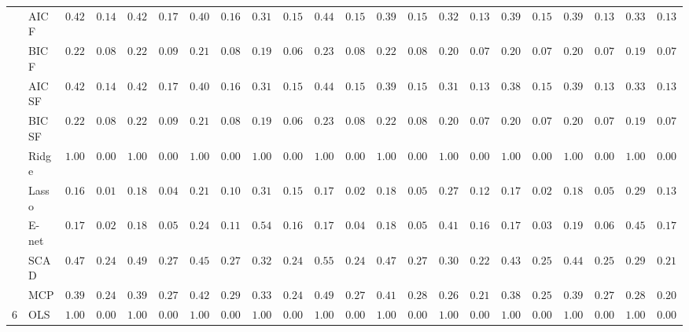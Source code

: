 \begin{tabular}{p{0.2cm}p{1cm}|p{0.6cm}p{0.6cm}|p{0.6cm}p{0.6cm}p{0.6cm}p{0.6cm}p{0.6cm}p{0.6cm}|p{0.6cm}p{0.6cm}p{0.6cm}p{0.6cm}p{0.6cm}p{0.6cm}|p{0.6cm}p{0.6cm}p{0.6cm}p{0.6cm}p{0.6cm}p{0.6cm}}
 & AIC F  & $0.4233$ & $0.1449$ & $0.4217$ & $0.1732$ & $0.4017$ & $0.1626$ & $0.3167$ & $0.1508$ & $0.4483$ & $0.1548$ & $0.3900$ & $0.1557$ & $0.3217$ & $0.1386$ & $0.3900$ & $0.1575$ & $0.3950$ & $0.1374$ & $0.3317$ & $0.1350$ \\
 & BIC F  & $0.2200$ & $0.0816$ & $0.2233$ & $0.0954$ & $0.2100$ & $0.0842$ & $0.1983$ & $0.0699$ & $0.2367$ & $0.0860$ & $0.2217$ & $0.0888$ & $0.2050$ & $0.0744$ & $0.2083$ & $0.0763$ & $0.2017$ & $0.0722$ & $0.1983$ & $0.0738$ \\
 & AIC SF  & $0.4233$ & $0.1449$ & $0.4217$ & $0.1732$ & $0.4017$ & $0.1626$ & $0.3167$ & $0.1508$ & $0.4483$ & $0.1548$ & $0.3900$ & $0.1557$ & $0.3167$ & $0.1350$ & $0.3883$ & $0.1536$ & $0.3950$ & $0.1374$ & $0.3317$ & $0.1350$ \\
 & BIC SF  & $0.2200$ & $0.0816$ & $0.2233$ & $0.0954$ & $0.2100$ & $0.0842$ & $0.1983$ & $0.0699$ & $0.2367$ & $0.0860$ & $0.2217$ & $0.0888$ & $0.2050$ & $0.0744$ & $0.2083$ & $0.0763$ & $0.2017$ & $0.0722$ & $0.1983$ & $0.0738$ \\
 & Ridge  & $1.0000$ & $0.0000$ & $1.0000$ & $0.0000$ & $1.0000$ & $0.0000$ & $1.0000$ & $0.0000$ & $1.0000$ & $0.0000$ & $1.0000$ & $0.0000$ & $1.0000$ & $0.0000$ & $1.0000$ & $0.0000$ & $1.0000$ & $0.0000$ & $1.0000$ & $0.0000$ \\
 & Lasso  & $0.1683$ & $0.0167$ & $0.1817$ & $0.0479$ & $0.2133$ & $0.1035$ & $0.3167$ & $0.1544$ & $0.1717$ & $0.0286$ & $0.1850$ & $0.0575$ & $0.2783$ & $0.1232$ & $0.1700$ & $0.0235$ & $0.1833$ & $0.0556$ & $0.2917$ & $0.1348$ \\
 & E-net  & $0.1700$ & $0.0235$ & $0.1833$ & $0.0503$ & $0.2400$ & $0.1192$ & $0.5433$ & $0.1635$ & $0.1733$ & $0.0405$ & $0.1867$ & $0.0594$ & $0.4133$ & $0.1632$ & $0.1733$ & $0.0328$ & $0.1917$ & $0.0686$ & $0.4517$ & $0.1729$ \\
 & SCAD  & $0.4700$ & $0.2455$ & $0.4933$ & $0.2710$ & $0.4517$ & $0.2725$ & $0.3267$ & $0.2461$ & $0.5567$ & $0.2418$ & $0.4733$ & $0.2790$ & $0.3017$ & $0.2206$ & $0.4367$ & $0.2538$ & $0.4400$ & $0.2590$ & $0.2933$ & $0.2134$ \\
 & MCP  & $0.3983$ & $0.2495$ & $0.3967$ & $0.2730$ & $0.4267$ & $0.2933$ & $0.3317$ & $0.2479$ & $0.4933$ & $0.2710$ & $0.4117$ & $0.2886$ & $0.2667$ & $0.2197$ & $0.3817$ & $0.2544$ & $0.3967$ & $0.2760$ & $0.2850$ & $0.2056$ \\\hline
6 & OLS  & $1.0000$ & $0.0000$ & $1.0000$ & $0.0000$ & $1.0000$ & $0.0000$ & $1.0000$ & $0.0000$ & $1.0000$ & $0.0000$ & $1.0000$ & $0.0000$ & $1.0000$ & $0.0000$ & $1.0000$ & $0.0000$ & $1.0000$ & $0.0000$ & $1.0000$ & $0.0000$ \\

\end{tabular}
